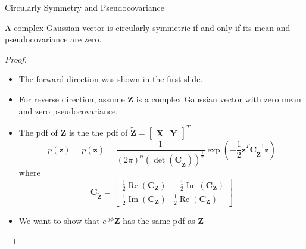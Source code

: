 \documentclass[t]{beamer}
\renewcommand\Re{\operatorname{Re}}
\renewcommand\Im{\operatorname{Im}}
\begin{document}
\begin{frame}{Circularly Symmetry and Pseudocovariance}
  \footnotesize
  \begin{theorem}
    \pause A complex Gaussian vector is circularly symmetric if and only if its mean and pseudocovariance are zero. \pause
  \end{theorem}
  \begin{proof} \renewcommand{\qedsymbol}{}
    \begin{itemize}
      \item \pause The forward direction was shown in the first slide.
      \item \pause For reverse direction, assume $\mathbf{Z}$ is a complex Gaussian vector with zero mean and zero pseudocovariance.
      \item \pause The pdf of $\mathbf{Z}$ is the the pdf of $\tilde{\mathbf{Z}} = \begin{bmatrix} \mathbf{X} & \mathbf{Y} \end{bmatrix}^T$
        \begin{equation*}
          p(\mathbf{z}) = p(\tilde{\mathbf{z}}) = \frac{1}{(2\pi)^n(\det(\mathbf{C}_{\tilde{\mathbf{Z}}}))^{\frac{1}{2}}} \exp\left(-\frac{1}{2} \tilde{\mathbf{z}}^T\mathbf{C}_{\tilde{\mathbf{Z}}}^{-1}\tilde{\mathbf{z}}\right)
        \end{equation*}
        \pause where
      \begin{equation*}
        \mathbf{C}_{\tilde{\mathbf{Z}}} = \begin{bmatrix} \frac{1}{2}\Re(\mathbf{C_Z}) & -\frac{1}{2}\Im(\mathbf{C_Z}) \\ \frac{1}{2}\Im(\mathbf{C_Z}) & \frac{1}{2}\Re(\mathbf{C_Z}) \end{bmatrix}
      \end{equation*}
      \item \pause We want to show that $e^{\ j\phi}\mathbf{Z}$ has the same pdf as $\mathbf{Z}$
    \end{itemize}
  \end{proof}
  \normalsize
\end{frame}
\end{document}
